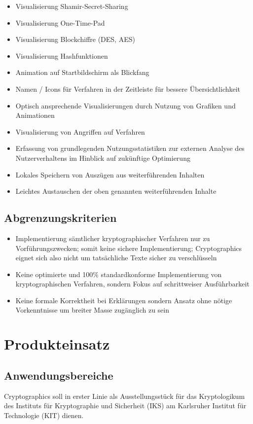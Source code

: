 \documentclass{article}
\begin{document}
\begin{itemize}
    \item Visualisierung Shamir-Secret-Sharing
    \item Visualisierung One-Time-Pad
    \item Visualisierung Blockchiffre (DES, AES)
    \item Visualisierung Hashfunktionen
    \item Animation auf Startbildschirm als Blickfang
    \item Namen / Icons für Verfahren in der Zeitleiste für bessere Übersichtlichkeit
    \item Optisch ansprechende Visualisierungen durch Nutzung von Grafiken und Animationen
    \item Visualisierung von Angriffen auf Verfahren
    \item Erfassung von grundlegenden Nutzungsstatistiken zur externen Analyse des Nutzerverhaltens im Hinblick auf zukünftige Optimierung
    \item Lokales Speichern von Auszügen aus weiterführenden Inhalten
    \item Leichtes Austauschen der oben genannten weiterführenden Inhalte
\end{itemize}

\subsection{Abgrenzungskriterien}
\begin{itemize}
	\item Implementierung sämtlicher kryptographischer Verfahren nur zu Vorführungszwecken; somit keine sichere Implementierung; Cryptographics eignet sich also nicht um tatsächliche Texte sicher zu verschlüsseln
    \item Keine optimierte und 100\% standardkonforme Implementierung von kryptographischen Verfahren,
        sondern Fokus auf schrittweiser Ausführbarkeit
    \item Keine formale Korrektheit bei Erklärungen sondern Ansatz ohne nötige Vorkenntnisse
        um breiter Masse zugänglich zu sein
\end{itemize}

\section{Produkteinsatz}
\subsection{Anwendungsbereiche}
\gls{Cryptographics} soll in erster Linie als Ausstellungsstück für das \gls{Kryptologikum} des Instituts für Kryptographie und Sicherheit (\gls{IKS}) am Karlsruher Institut für Technologie (\gls{KIT}) dienen.
\end{document}
